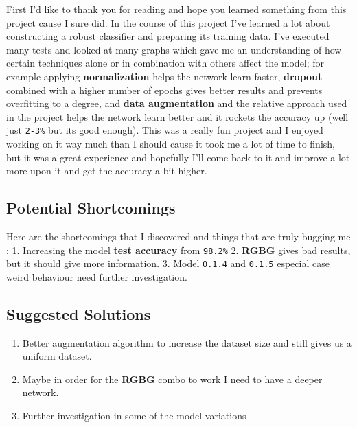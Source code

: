 \documentclass[11pt]{article}
\providecommand{\tightlist}{%
      \setlength{\itemsep}{0pt}\setlength{\parskip}{0pt}}
\begin{document}
First I'd like to thank you for reading and hope you learned something
from this project cause I sure did. In the course of this project I've
learned a lot about constructing a robust classifier and preparing its
training data. I've executed many tests and looked at many graphs which
gave me an understanding of how certain techniques alone or in
combination with others affect the model; for example applying
\textbf{normalization} helps the network learn faster, \textbf{dropout}
combined with a higher number of epochs gives better results and
prevents overfitting to a degree, and \textbf{data augmentation} and the
relative approach used in the project helps the network learn better and
it rockets the accuracy up (well just \texttt{2-3\%} but its good
enough). This was a really fun project and I enjoyed working on it way
much than I should cause it took me a lot of time to finish, but it was
a great experience and hopefully I'll come back to it and improve a lot
more upon it and get the accuracy a bit higher.

    \hypertarget{potential-shortcomings}{%
\subsection{Potential Shortcomings}\label{potential-shortcomings}}

Here are the shortcomings that I discovered and things that are truly
bugging me : 1. Increasing the model \textbf{test accuracy} from
\texttt{98.2\%} 2. \textbf{RGBG} gives bad results, but it should give
more information. 3. Model \texttt{0.1.4} and \texttt{0.1.5} especial
case weird behaviour need further investigation.

    \hypertarget{suggested-solutions}{%
\subsection{Suggested Solutions}\label{suggested-solutions}}

\begin{enumerate}
\def\labelenumi{\arabic{enumi}.}
\tightlist
\item
  Better augmentation algorithm to increase the dataset size and still
  gives us a uniform dataset.
\item
  Maybe in order for the \textbf{RGBG} combo to work I need to have a
  deeper network.
\item
  Further investigation in some of the model variations
\end{enumerate}
\end{document}
